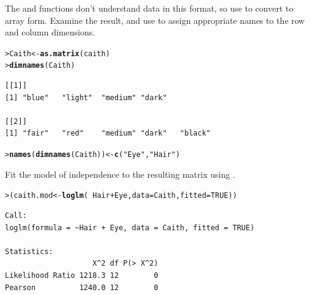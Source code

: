 \documentclass[10pt]{report}\usepackage[]{graphicx}\usepackage[]{color}
\makeatletter
\newcommand{\hlnum}[1]{\textcolor[rgb]{0.686,0.059,0.569}{#1}}%
\newcommand{\hlstr}[1]{\textcolor[rgb]{0.192,0.494,0.8}{#1}}%
\newcommand{\hlopt}[1]{\textcolor[rgb]{0,0,0}{#1}}%
\newcommand{\hlstd}[1]{\textcolor[rgb]{0.345,0.345,0.345}{#1}}%
\newcommand{\hlkwb}[1]{\textcolor[rgb]{0.69,0.353,0.396}{#1}}%
\newcommand{\hlkwc}[1]{\textcolor[rgb]{0.333,0.667,0.333}{#1}}%
\newcommand{\hlkwd}[1]{\textcolor[rgb]{0.737,0.353,0.396}{\textbf{#1}}}%
\newenvironment{kframe}{%
 \def\at@end@of@kframe{}%
 \ifinner\ifhmode%
  \def\at@end@of@kframe{\end{minipage}}%
  \begin{minipage}{\columnwidth}%
 \fi\fi%
 \def\FrameCommand##1{\hskip\@totalleftmargin \hskip-\fboxsep
 \colorbox{shadecolor}{##1}\hskip-\fboxsep
     \hskip-\linewidth \hskip-\@totalleftmargin \hskip\columnwidth}%
 \MakeFramed {\advance\hsize-\width
   \@totalleftmargin\z@ \linewidth\hsize
   \@setminipage}}%
 {\par\unskip\endMakeFramed%
 \at@end@of@kframe}
\newenvironment{knitrout}{}{} %
\renewenvironment{knitrout}{\small\renewcommand{\baselinestretch}{.85}}{} %
\makeatother
\begin{document}
\begin{Exercises}
  \begin{enumerate*}
    \item The  and  functions don't understand data in this format, 
    so use  
    to convert to array form.  Examine the result, and use  to %
    assign appropriate names to the row and column dimensions.
    \begin{ans}
\begin{knitrout}\footnotesize
{}\color{fgcolor}\begin{kframe}
\begin{alltt}
\hlstd{> }\hlstd{Caith} \hlkwb{<-} \hlkwd{as.matrix}\hlstd{(caith)}
\hlstd{> }\hlkwd{dimnames}\hlstd{(Caith)}
\end{alltt}
\begin{verbatim}
[[1]]
[1] "blue"   "light"  "medium" "dark"  

[[2]]
[1] "fair"   "red"    "medium" "dark"   "black" 
\end{verbatim}
\begin{alltt}
\hlstd{> }\hlkwd{names}\hlstd{(}\hlkwd{dimnames}\hlstd{(Caith))} \hlkwb{<-} \hlkwd{c}\hlstd{(}\hlstr{"Eye"}\hlstd{,} \hlstr{"Hair"}\hlstd{)}
\end{alltt}
\end{kframe}
\end{knitrout}
    \end{ans}
    
    \item Fit the model of independence to the resulting matrix using .
    \begin{ans}
\begin{knitrout}\footnotesize
{}\color{fgcolor}\begin{kframe}
\begin{alltt}
\hlstd{> }\hlstd{(caith.mod} \hlkwb{<-} \hlkwd{loglm}\hlstd{(}\hlopt{~}\hlstd{Hair}\hlopt{+}\hlstd{Eye,} \hlkwc{data}\hlstd{=Caith,} \hlkwc{fitted}\hlstd{=}\hlnum{TRUE}\hlstd{))}
\end{alltt}
\begin{verbatim}
Call:
loglm(formula = ~Hair + Eye, data = Caith, fitted = TRUE)

Statistics:
                    X^2 df P(> X^2)
Likelihood Ratio 1218.3 12        0
Pearson          1240.0 12        0
\end{verbatim}
\end{kframe}
\end{knitrout}
    \end{ans}
    

\end{enumerate*}
\end{Exercises}
\end{document}
